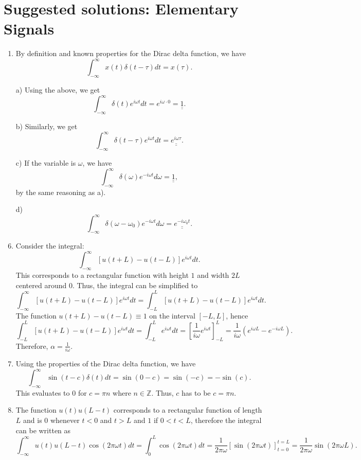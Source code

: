 \newpage
\section{Suggested solutions: Elementary Signals}

\begin{enumerate}
\item By definition and known properties for the Dirac delta function, we have
$$\int_{-\infty}^{\infty}x(t)\delta(t-\tau)dt=x(\tau).$$

\item[a)]
Using the above, we get
$$\int_{-\infty}^{\infty}\delta(t)e^{i\omega t}dt=e^{i\omega\cdot 0}=\underline{\underline{1}}.$$

\item[b)]
Similarly, we get
$$\int_{-\infty}^{\infty}\delta(t-\tau)e^{i\omega t}dt=\underline{\underline{e^{i\omega\tau}}}.$$

\item[c)]
If the variable is $\omega$, we have
$$\int_{-\infty}^{\infty}\delta(\omega)e^{-i\omega t}d\omega=\underline{\underline{1}},$$
by the same reasoning as a). 

\item[d)]
$$\int_{-\infty}^{\infty}\delta(\omega-\omega_{0})e^{-i\omega t}d\omega=\underline{\underline{e^{-i\omega_{0}t}}}.$$

\item Consider the integral:
$$\int_{-\infty}^{\infty}[u(t+L)-u(t-L)]e^{i\omega t}dt.$$
This corresponds to a rectangular function with height $1$ and width $2L$ centered around $0$. Thus, the integral can be simplified to
$$\int_{-\infty}^{\infty}[u(t+L)-u(t-L)]e^{i\omega t}dt=\int_{-L}^{L}[u(t+L)-u(t-L)]e^{i\omega t}dt.$$
The function $u(t+L)-u(t-L)\equiv 1$ on the interval $[-L,L]$, hence
$$\int_{-L}^{L}[u(t+L)-u(t-L)]e^{i\omega t}dt=\int_{-L}^{L}e^{i\omega t}dt=\left[\frac{1}{i\omega}e^{i\omega t}\right]_{-L}^{L}=\frac{1}{i\omega}(e^{i\omega L}-e^{-i\omega L}).$$
Therefore, $\alpha=\frac{1}{i\omega}$.

\item Using the properties of the Dirac delta function, we have
$$\int_{-\infty}^{\infty}\sin(t-c)\delta(t)dt=\sin(0-c)=\sin(-c)=-\sin(c).$$
This evaluates to $0$ for $c=\pi n$ where $n\in\mathbb{Z}$. Thus, $c$ has to be $c=\pi n$.

\item The function $u(t)u(L-t)$ corresponds to a rectangular function of length $L$ and is $0$ whenever $t<0$ and $t>L$ and $1$ if $0<t<L$, therefore the integral can be written as
$$\int_{-\infty}^{\infty}u(t)u(L-t)\cos(2\pi\omega t)dt=\int_{0}^{L}\cos(2\pi\omega t)dt=\frac{1}{2\pi\omega}\left[\sin(2\pi\omega t)\right]_{t=0}^{t=L}=\frac{1}{2\pi\omega}\sin(2\pi\omega L).$$


\end{enumerate}